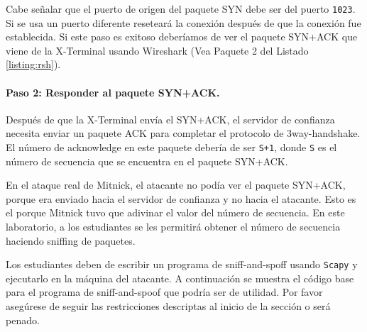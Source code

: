 Cabe señalar que el puerto de origen del paquete SYN debe ser del puerto \texttt{1023}. Si se usa un puerto diferente \rsh reseteará la conexión después de que la conexión fue establecida. Si este paso es exitoso deberíamos de ver el paquete SYN+ACK que viene de la X-Terminal usando Wireshark (Vea Paquete 2 del Listado \ref{listing:rsh}).


\paragraph{Paso 2: Responder al paquete SYN+ACK.}
Después de que la X-Terminal envía el SYN+ACK, el servidor de confianza necesita enviar un paquete ACK para completar el protocolo de 3way-handshake.
El número de acknowledge en este paquete debería de ser \texttt{S+1}, donde \texttt{S} es el número de secuencia que se encuentra en el paquete SYN+ACK.

En el ataque real de Mitnick, el atacante no podía ver el paquete SYN+ACK, porque era enviado hacia el servidor de confianza y no hacia el atacante.
Esto es el porque Mitnick tuvo que adivinar el valor del número de secuencia.
En este laboratorio, a los estudiantes se les permitirá obtener el número de secuencia haciendo sniffing de paquetes.

Los estudiantes deben de escribir un programa de sniff-and-spoff usando \texttt{Scapy} y ejecutarlo en la máquina del atacante. A continuación se muestra el código base para el programa de sniff-and-spoof que podría ser de utilidad. Por favor asegúrese de seguir las restricciones descriptas al inicio de la sección o será penado.


